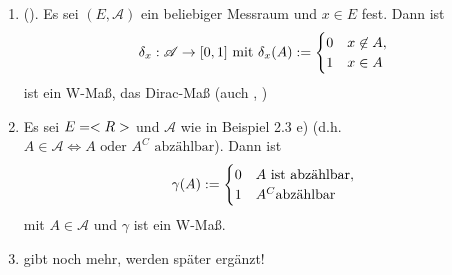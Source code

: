 \begin{example}
	\begin{enumerate}
		\item (). Es sei $(E,\mathscr{A})$ ein beliebiger Messraum und $x \in E$ fest. Dann ist
		\begin{align}
			\delta_x: \mathscr{A} \to [0,1] \text{ mit } \delta_x(A) := \begin{cases}
				0 & x \not \in A,\\
				1 & x \in A
			\end{cases}\notag
		\end{align}
		ist ein W-Maß, das Dirac-Maß (auch , )
		\item Es sei $E=<R>$ und $\mathscr{A}$ wie in Beispiel 2.3 e) %
		(d.h. $A \in \mathscr{A} \Longleftrightarrow A \text{ oder } A^C \text{ abzählbar}$). Dann ist
		\begin{align}
		\gamma(A) := \begin{cases}
		0 & A \text{ ist abzählbar},\\
		1 & A^C \text{abzählbar}
		\end{cases}\notag
		\end{align} mit $A \in \mathscr{A}$ und $\gamma$ ist ein W-Maß.
		\item gibt noch mehr, werden später ergänzt!
	\end{enumerate}
\end{example}